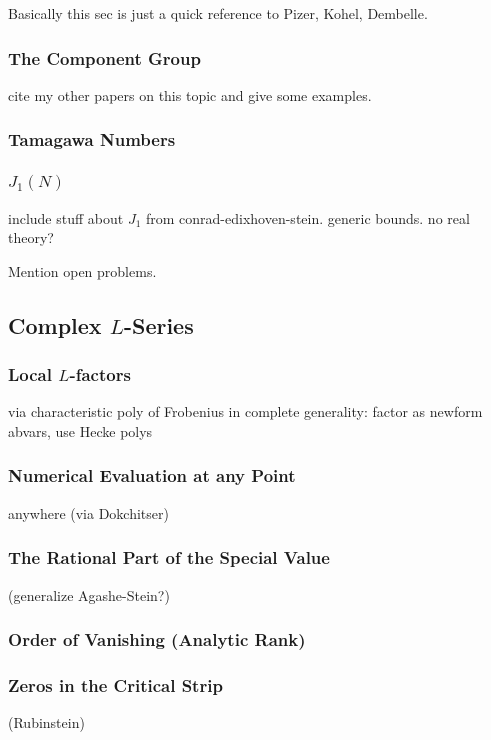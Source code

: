 \documentclass{article}
\begin{document}
Basically this sec is just a quick reference to Pizer, Kohel, Dembelle.

\subsubsection{The Component Group}
cite my other papers on this topic and give some examples.

\subsubsection{Tamagawa Numbers}

\subsubsection{$J_1(N)$}
include stuff about $J_1$ from conrad-edixhoven-stein.  generic
bounds.  no real theory?

Mention open problems.

\subsection{Complex $L$-Series}


\subsubsection{Local $L$-factors}
via characteristic poly of Frobenius in complete
generality: factor as newform abvars, use Hecke polys


\subsubsection{Numerical Evaluation at any Point}
anywhere (via Dokchitser)

\subsubsection{The Rational Part of the Special Value}
(generalize Agashe-Stein?)

\subsubsection{Order of Vanishing (Analytic Rank)}

\subsubsection{Zeros in the Critical Strip}
(Rubinstein)
\end{document}
